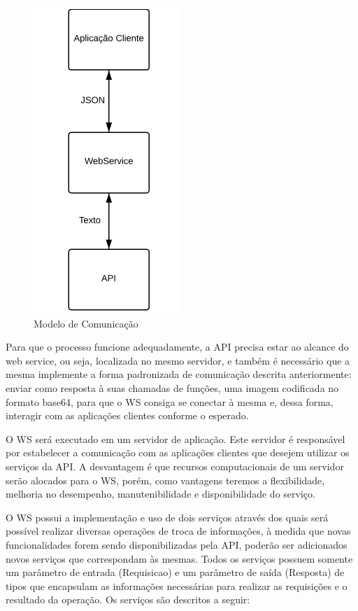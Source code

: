 \documentclass[12pt]{article}
\begin{document}
\begin{figure}[ht]
	\centering
	\includegraphics[width=.3\textwidth]{modelo-comunicacao2.png}
	\caption{Modelo de Comunicação}
	\label{fig:Figura2}
\end{figure}

Para que o processo funcione adequadamente, a API precisa estar ao alcance do web service, ou seja, localizada no mesmo servidor, e também é necessário que a mesma implemente a forma padronizada de comunicação descrita anteriormente: enviar como resposta à suas chamadas de funções, uma imagem codificada no formato base64, para que o
WS consiga se conectar à mesma e, dessa forma, interagir com as aplicações clientes conforme o esperado.

O WS será executado em um servidor de aplicação. Este servidor
é responsável por estabelecer a comunicação com as aplicações clientes que desejem utilizar os serviços da API. 
A desvantagem é que recursos computacionais de um servidor serão alocados para o WS, porém, como vantagens teremos a flexibilidade, melhoria no desempenho, manutenibilidade e disponibilidade do serviço.


O WS possui a implementação e uso de dois serviços através dos quais será possível realizar diversas operações de troca de informações, à medida que novas funcionalidades forem sendo disponibilizadas pela API, poderão ser adicionados novos serviços que correspondam às mesmas.
Todos os serviços possuem somente um parâmetro de entrada (Requisicao) e um parâmetro de saída (Resposta) de tipos que encapsulam as informações necessárias para realizar as requisições e o resultado da operação. Os serviços são descritos a seguir:
\end{document}
